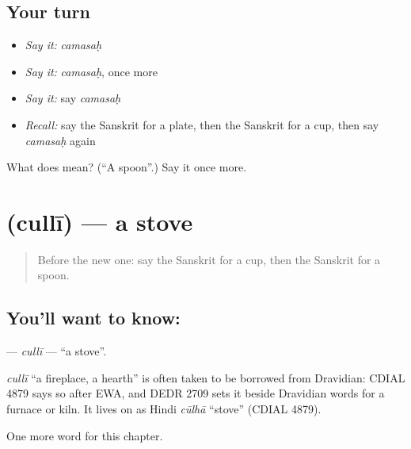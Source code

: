 \subsection*{Your turn}
\begin{itemize}
\raggedright
  \item \emph{Say it:} \emph{camasaḥ}
  \item \emph{Say it:} \emph{camasaḥ}, once more
  \item \emph{Say it:} say \emph{camasaḥ}
  \item \emph{Recall:} say the Sanskrit for a plate, then the Sanskrit for a cup, then say \emph{camasaḥ} again
\end{itemize}

\begin{tcolorbox}[breakable,colback=teal!4,colframe=teal!35!black,title={Before you move on}]
What does  mean? (\textquotedblleft{}A spoon\textquotedblright{}.) Say it once more.
\end{tcolorbox}
\section[\texorpdfstring{\sk{चुल्ली} (cullī)}{चुल्ली (cullī)}]{ (cullī) — a stove}

\label{lesson:SA-C102-culli}



\begin{quote}
Before the new one: say the Sanskrit for a cup, then the Sanskrit for a spoon.
\end{quote}

\subsection*{You'll want to know: }
\textbf{} — \emph{cullī} — \textquotedblleft{}a stove\textquotedblright{}.

\begin{cousinweb}
\emph{cullī} \textquotedblleft{}a fireplace, a hearth\textquotedblright{} is often taken to be borrowed from Dravidian: CDIAL 4879 says so after EWA, and DEDR 2709 sets it beside Dravidian words for a furnace or kiln. It lives on as Hindi \emph{cūlhā} \textquotedblleft{}stove\textquotedblright{} (CDIAL 4879).
\end{cousinweb}

\begin{grammarlens}[title={What you've built}]
One more word for this chapter.
\end{grammarlens}

